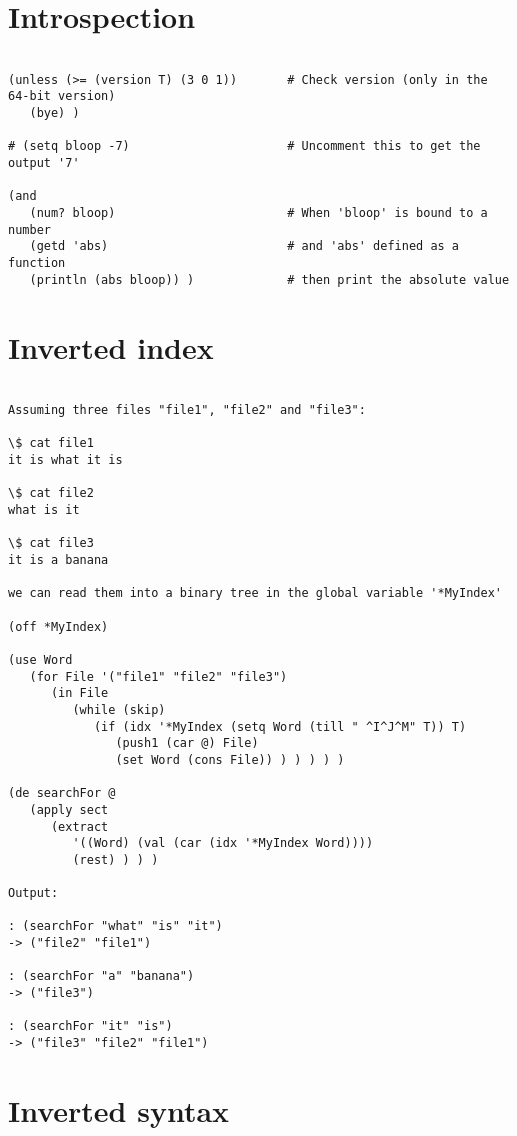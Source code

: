 \section*{Introspection}

\begin{verbatim}

(unless (>= (version T) (3 0 1))       # Check version (only in the 64-bit version)
   (bye) )

# (setq bloop -7)                      # Uncomment this to get the output '7'

(and
   (num? bloop)                        # When 'bloop' is bound to a number
   (getd 'abs)                         # and 'abs' defined as a function
   (println (abs bloop)) )             # then print the absolute value

\end{verbatim}

\section*{Inverted index}

\begin{verbatim}

Assuming three files "file1", "file2" and "file3":

\$ cat file1
it is what it is

\$ cat file2
what is it

\$ cat file3
it is a banana

we can read them into a binary tree in the global variable '*MyIndex'

(off *MyIndex)

(use Word
   (for File '("file1" "file2" "file3")
      (in File
         (while (skip)
            (if (idx '*MyIndex (setq Word (till " ^I^J^M" T)) T)
               (push1 (car @) File)
               (set Word (cons File)) ) ) ) ) )

(de searchFor @
   (apply sect
      (extract
         '((Word) (val (car (idx '*MyIndex Word))))
         (rest) ) ) )

Output:

: (searchFor "what" "is" "it")
-> ("file2" "file1")

: (searchFor "a" "banana")
-> ("file3")

: (searchFor "it" "is")
-> ("file3" "file2" "file1")

\end{verbatim}

\section*{Inverted syntax}

